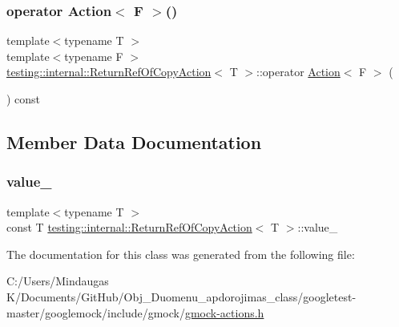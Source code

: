 \mbox{\label{classtesting_1_1internal_1_1_return_ref_of_copy_action_a8b4829fbb46c3ca6468f3eb5c5b42493}} 
\subsubsection{\texorpdfstring{operator Action$<$ F $>$()}{operator Action< F >()}\hspace{0.1cm}{\footnotesize\ttfamily [3/3]}}
{\footnotesize\ttfamily template$<$typename T $>$ \\
template$<$typename F $>$ \\
\mbox{\hyperlink{classtesting_1_1internal_1_1_return_ref_of_copy_action}{testing\+::internal\+::\+Return\+Ref\+Of\+Copy\+Action}}$<$ T $>$\+::operator \mbox{\hyperlink{classtesting_1_1_action}{Action}}$<$ F $>$ (\begin{DoxyParamCaption}{ }\end{DoxyParamCaption}) const\hspace{0.3cm}{\ttfamily [inline]}}



\subsection{Member Data Documentation}
\mbox{\label{classtesting_1_1internal_1_1_return_ref_of_copy_action_a41fdd44b2021e01db916c6d5afcbf73f}} 
\subsubsection{\texorpdfstring{value\_}{value\_}}
{\footnotesize\ttfamily template$<$typename T $>$ \\
const T \mbox{\hyperlink{classtesting_1_1internal_1_1_return_ref_of_copy_action}{testing\+::internal\+::\+Return\+Ref\+Of\+Copy\+Action}}$<$ T $>$\+::value\+\_\+\hspace{0.3cm}{\ttfamily [private]}}



The documentation for this class was generated from the following file\+:\begin{DoxyCompactItemize}
\item 
C\+:/\+Users/\+Mindaugas K/\+Documents/\+Git\+Hub/\+Obj\+\_\+\+Duomenu\+\_\+apdorojimas\+\_\+class/googletest-\/master/googlemock/include/gmock/\mbox{\hyperlink{googletest-master_2googlemock_2include_2gmock_2gmock-actions_8h}{gmock-\/actions.\+h}}\end{DoxyCompactItemize}
